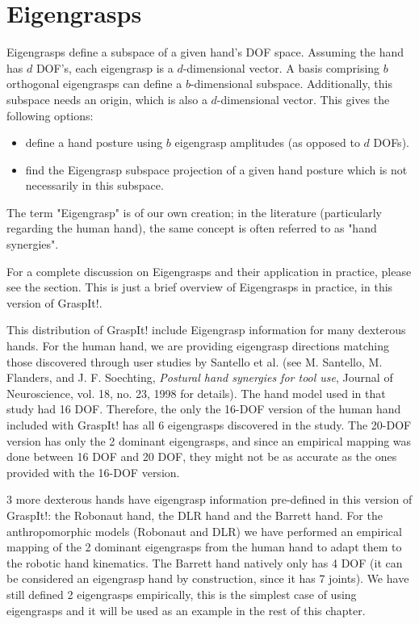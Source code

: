 \section{Eigengrasps}


Eigengrasps define a subspace of a given hand's DOF space. Assuming
the hand has $d$ DOF's, each eigengrasp is a $d$-dimensional vector. A
basis comprising $b$ orthogonal eigengrasps can define a
$b$-dimensional subspace. Additionally, this subspace needs an origin,
which is also a $d$-dimensional vector. This gives the following
options:
\begin{itemize}
\item define a hand posture using $b$ eigengrasp amplitudes (as opposed
  to $d$ DOFs).
\item find the Eigengrasp subspace projection of a given hand posture
  which is not necessarily in this subspace.
\end{itemize}

The term "Eigengrasp" is of our own creation; in the literature
(particularly regarding the human hand), the same concept is often
referred to as "hand synergies".

For a complete discussion on Eigengrasps and their application in
practice, please see the 
section. This is just a brief overview of Eigengrasps in practice, in
this version of GraspIt!.

This distribution of GraspIt! include Eigengrasp information for many
dexterous hands. For the human hand, we are providing eigengrasp
directions matching those discovered through user studies by Santello
et al. (see M. Santello, M. Flanders, and J. F. Soechting,
\textit{Postural hand synergies for tool use}, Journal of
Neuroscience, vol. 18, no. 23, 1998 for details). The hand model used
in that study had 16 DOF. Therefore, the only the 16-DOF version of
the human hand included with GraspIt! has all 6 eigengrasps discovered
in the study. The 20-DOF version has only the 2 dominant eigengrasps,
and since an empirical mapping was done between 16 DOF and 20 DOF,
they might not be as accurate as the ones provided with the 16-DOF
version.

3 more dexterous hands have eigengrasp information pre-defined in this
version of GraspIt!: the Robonaut hand, the DLR hand and the Barrett
hand. For the anthropomorphic models (Robonaut and DLR) we have
performed an empirical mapping of the 2 dominant eigengrasps from the
human hand to adapt them to the robotic hand kinematics. The Barrett
hand natively only has 4 DOF (it can be considered an eigengrasp hand
by construction, since it has 7 joints). We have still defined 2
eigengrasps empirically, this is the simplest case of using
eigengrasps and it will be used as an example in the rest of this
chapter.

